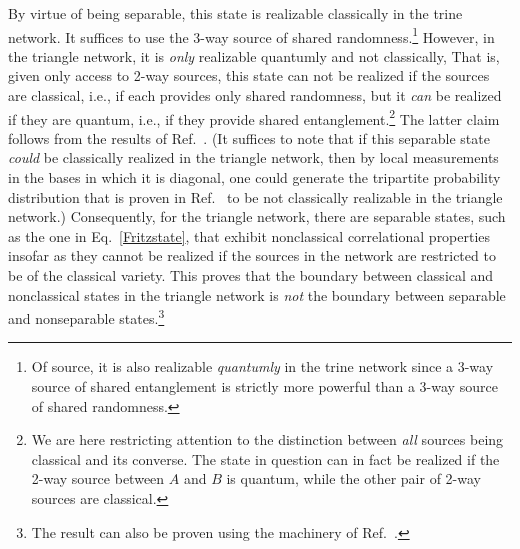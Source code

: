\documentclass[prx,11pt,letterpaper,twocolumn,accepted=2023-11-27]{quantumarticle}
\theoremstyle{plain}
\theoremstyle{definition}
\begin{document}
\begin{appendices}
By virtue of being separable, this state is realizable classically in the trine network.
 It suffices to use the 3-way source of shared randomness.\footnote{Of source, it is also realizable {\em quantumly} in the 
 trine network since a 3-way source of shared entanglement is strictly more powerful than a 3-way source of shared randomness.} 
 However, in the triangle network, it is {\em only} realizable quantumly and not classically,  That is, given only access to 2-way sources, this state can not be realized if the sources are classical, i.e., if each provides only shared randomness, but it {\em can} be realized if they are quantum, i.e., if they provide shared entanglement.\footnote{We are here restricting attention to the distinction between {\em all} sources being classical and its converse.
The state in question can in fact be realized if the 2-way source between $A$ and $B$ is quantum, while the other pair of 2-way sources are classical. 
}
   The latter claim follows from the results of Ref.~\cite{Fritz2012beyondBell}.  
(It suffices to note that if this separable state {\em could} be classically realized in the triangle network, then by local measurements in the bases in which it is diagonal, one could generate the tripartite probability distribution that is proven in Ref.~\cite{Fritz2012beyondBell} to be not classically realizable in the triangle network.) 
Consequently, for the triangle network, there are separable states, such as the one in Eq.~\eqref{Fritzstate}, that exhibit nonclassical correlational properties insofar as they cannot be realized if the sources in the network are restricted to be of the classical variety.  This proves that the boundary between classical and nonclassical states in the triangle network is {\em not} the boundary between separable and nonseparable states.\footnote{The result can also be proven using the machinery of Ref.~\cite{navascues2020genuine}.}





\end{appendices}
\end{document}
